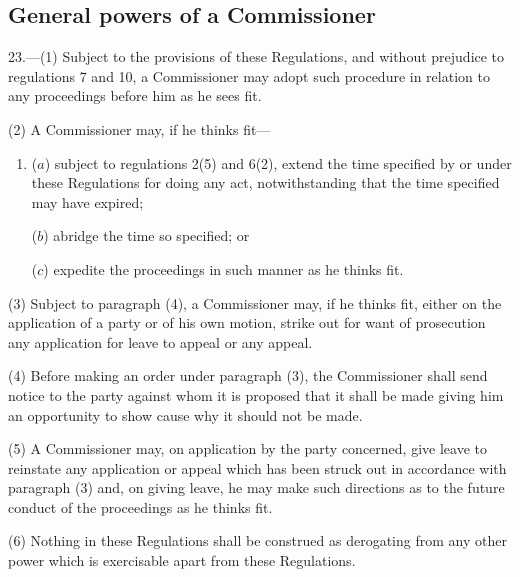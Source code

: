 \documentclass[12pt,a4paper]{article}
\begin{document}

\subsection[23. General powers of a Commissioner]{General powers of a Commissioner}

23.—(1) Subject to the provisions of these Regulations, and without prejudice to regulations 7 and 10, a Commissioner may adopt such procedure in relation to any proceedings before him as he sees fit.

(2) A Commissioner may, if he thinks fit—
\begin{enumerate}\item[]
($a$) subject to regulations 2(5) and 6(2), extend the time specified by or under these Regulations for doing any act, notwithstanding that the time specified may have expired;

($b$) abridge the time so specified; or

($c$) expedite the proceedings in such manner as he thinks fit.
\end{enumerate}

(3) Subject to paragraph (4), a Commissioner may, if he thinks fit, either on the application of a party or of his own motion, strike out for want of prosecution any application for leave to appeal or any appeal.

(4) Before making an order under paragraph (3), the Commissioner shall send notice to the party against whom it is proposed that it shall be made giving him an opportunity to show cause why it should not be made.

(5) A Commissioner may, on application by the party concerned, give leave to reinstate any application or appeal which has been struck out in accordance with paragraph (3) and, on giving leave, he may make such directions as to the future conduct of the proceedings as he thinks fit.

(6) Nothing in these Regulations shall be construed as derogating from any other power which is exercisable apart from these Regulations.
\end{document}
